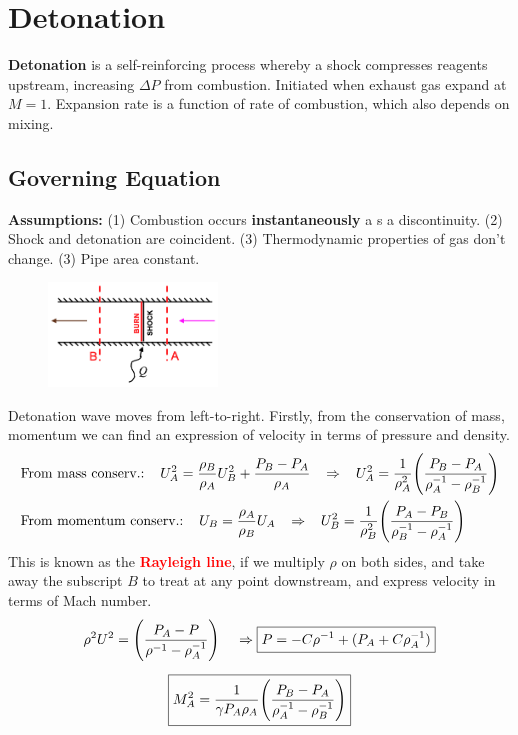 \documentclass[a4paper,10pt]{article}
\begin{document}
\newpage
\section{Detonation}
\textbf{Detonation} is a self-reinforcing process whereby a shock compresses reagents upstream, increasing $\Delta P$ from combustion. Initiated when exhaust gas expand at $M=1$. Expansion rate is a function of rate of combustion, which also depends on mixing. 
\subsection{Governing Equation}
\textbf{Assumptions:} (1) Combustion occurs \textbf{instantaneously} a s a discontinuity. (2) Shock and detonation are coincident. (3) Thermodynamic properties of gas don't change. (3) Pipe area constant.

\begin{figure}[H]
    \centering
    \includegraphics[width=0.4\textwidth]{Figure/detonation scheme.png}
\end{figure}

\vspace*{-0.6cm}
Detonation wave moves from left-to-right. Firstly, from the conservation of mass, momentum we can find an expression of velocity in terms of pressure and density. 
\begin{gather*}
    \begin{split}
        &\text{From mass conserv.:}\hspace*{0.4cm}U_A^2 = \frac{\rho_B}{\rho_A}U_B^2+\frac{P_B-P_A}{\rho_A}\hspace*{0.3cm}\Rightarrow\hspace*{0.3cm}U_A^2 = \frac{1}{\rho_A^2}\Bigg(\frac{P_B-P_A}{\rho_A^{-1}-\rho_B^{-1}}\Bigg)\\
        &\text{From momentum conserv.:}\hspace*{0.4cm}U_B = \frac{\rho_A}{\rho_B}U_A\hspace*{0.3cm}\Rightarrow\hspace*{0.3cm}U_B^2 = \frac{1}{\rho_B^2}\Bigg(\frac{P_A-P_B}{\rho_B^{-1}-\rho_A^{-1}}\Bigg)\\
    \end{split} 
\end{gather*}
This is known as the \textcolor{red}{\textbf{Rayleigh line}}, if we multiply $\rho$ on both sides, and take away the subscript $B$ to treat at any point downstream, and express velocity in terms of Mach number. 
\begin{gather*}
    \rho^2U^2 = \Bigg(\frac{P_A-P}{\rho^{-1}-\rho_A^{-1}}\Bigg)\hspace*{0.4cm}\Rightarrow\boxed{P = -C\rho^{-1}+(P_A+C\rho_A^{-1})}\\[0.2cm]
    \boxed{M_A^2 = \frac{1}{\gamma P_A\rho_A}\Bigg(\frac{P_B-P_A}{\rho_A^{-1}-\rho_B^{-1}}\Bigg)}
\end{gather*}
\end{document}
